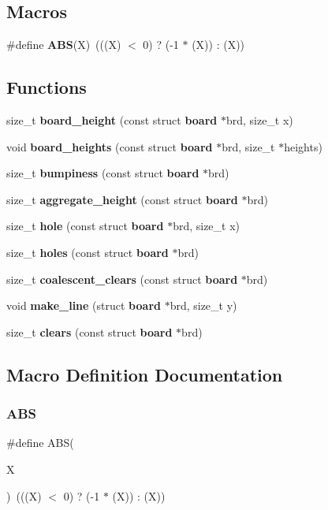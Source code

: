 \subsection*{Macros}
\begin{DoxyCompactItemize}
\item 
\#define \textbf{ A\+BS}(X)~(((X) $<$ 0) ? (-\/1 $\ast$ (X)) \+: (X))
\end{DoxyCompactItemize}
\subsection*{Functions}
\begin{DoxyCompactItemize}
\item 
size\+\_\+t \textbf{ board\+\_\+height} (const struct \textbf{ board} $\ast$brd, size\+\_\+t x)
\item 
void \textbf{ board\+\_\+heights} (const struct \textbf{ board} $\ast$brd, size\+\_\+t $\ast$heights)
\item 
size\+\_\+t \textbf{ bumpiness} (const struct \textbf{ board} $\ast$brd)
\item 
size\+\_\+t \textbf{ aggregate\+\_\+height} (const struct \textbf{ board} $\ast$brd)
\item 
size\+\_\+t \textbf{ hole} (const struct \textbf{ board} $\ast$brd, size\+\_\+t x)
\item 
size\+\_\+t \textbf{ holes} (const struct \textbf{ board} $\ast$brd)
\item 
size\+\_\+t \textbf{ coalescent\+\_\+clears} (const struct \textbf{ board} $\ast$brd)
\item 
void \textbf{ make\+\_\+line} (struct \textbf{ board} $\ast$brd, size\+\_\+t y)
\item 
size\+\_\+t \textbf{ clears} (const struct \textbf{ board} $\ast$brd)
\end{DoxyCompactItemize}


\subsection{Macro Definition Documentation}
\mbox{\label{tools_8h_adefab4344518e9d35a80d87c20c0fa48}} 
\subsubsection{A\+BS}
{\footnotesize\ttfamily \#define A\+BS(\begin{DoxyParamCaption}\item[{}]{X }\end{DoxyParamCaption})~(((X) $<$ 0) ? (-\/1 $\ast$ (X)) \+: (X))}



